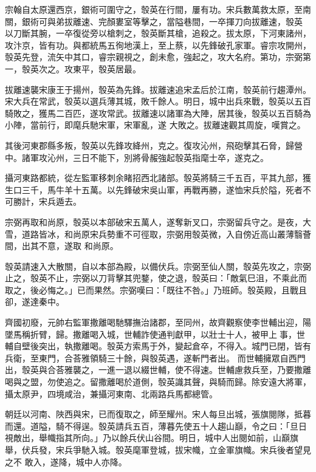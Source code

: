 \begin{pinyinscope}
 宗翰自太原還西京，銀術可圍守之，彀英在行間，屢有功。宋兵數萬救太原，至南關，銀術可與弟拔離速、完顏婁室等擊之，當隘巷間，一卒揮刀向拔離速，彀英
 以刀斷其腕，一卒復從旁以槍刺之，彀英斷其槍，追殺之。拔太原，下河東諸州，攻汴京，皆有功。與都統馬五徇地漢上，至上蔡，以先鋒破孔家軍。睿宗攻開州，彀英先登，流矢中其口，睿宗親視之，創未愈，強起之，攻大名府。第功，宗弼第一，彀英次之。攻東平，彀英居最。



 拔離速襲宋康王于揚州，彀英為先鋒。拔離速追宋孟后於江南，彀英前行趨潭州。宋大兵在常武，彀英以選兵薄其城，敗千餘人。明日，城中出兵來戰，彀英以五百騎敗之，獲馬二百匹，遂攻常武。拔離速以諸軍為大陣，居其後，彀英以五百騎為小陣，當前行，即麾兵馳宋軍，宋軍亂，遂
 大敗之。拔離速觀其周旋，嘆賞之。



 其後河東郡縣多叛，彀英以先鋒攻絳州，克之。復攻沁州，飛砲擊其石脅，歸營中。諸軍攻沁州，三日不能下，別將骨赧強起彀英指麾士卒，遂克之。



 攝河東路都統，從左監軍移刺余睹招西北諸部。彀英將騎三千五百，平其九部，獲生口三千，馬牛羊十五萬。以先鋒破宋吳山軍，再戰再勝，遂恤宋兵於隘，死者不可勝計，宋兵遁去。



 宗弼再取和尚原，彀英以本部破宋五萬人，遂奪新叉口，宗弼留兵守之。是夜，大雪，道路皆冰，和尚原宋兵勢重不可徑取，宗弼用彀英微，入自傍近高山叢薄翳薈間，出其不意，遂取
 和尚原。



 彀英請速入大散關，自以本部為殿，以備伏兵。宗弼至仙人關，彀英先攻之，宗弼止之，彀英不止，宗弼以刀背擊其兜鍪，使之退，彀英曰：「敵氣巳沮，不乘此而取之，後必悔之。」已而果然。宗弼嘆曰：「既往不咎。」乃班師。彀英殿，且戰且卻，遂達秦中。



 齊國初廢，元帥右監軍撒離喝馳驛撫治諸郡，至同州，故齊觀察使李世輔出迎，陽墜馬稱折臂，歸。撒離喝入城，世輔詐使通判獻甲，以壯士十人，被甲上事，世輔自壁後突出，執撒離喝。彀英方索馬于外，變起倉卒，不得入。城門已閉，皆有兵衛，至東門，合荅雅領騎三十餘，與彀英遇，遂斬門者出。
 而世輔擁眾自西門出，彀英與合荅雅襲之，一進一退以綴世輔，使不得速。世輔慮救兵至，乃要撒離喝與之盟，勿使追之。留撒離喝於道側，彀英識其聲，與騎而歸。除安遠大將軍，攝太原尹，四境咸治，兼攝河東南、北兩路兵馬都總管。



 朝廷以河南、陜西與宋，已而復取之，師至耀州。宋人每旦出城，張旗閱隊，抵暮而還。道隘，騎不得逞。彀英請兵五百，薄暮先使五十人趨山巔，令之曰：「旦日視敵出，舉幟指其所向。」乃以餘兵伏山谷間。明日，城中人出閱如前，山巔旗舉，伏兵發，宋兵爭馳入城。彀英麾軍登城，拔宋幟，立金軍旗幟。宋兵後者望見之不
 敢入，遂降，城中人亦降。




\end{pinyinscope}
